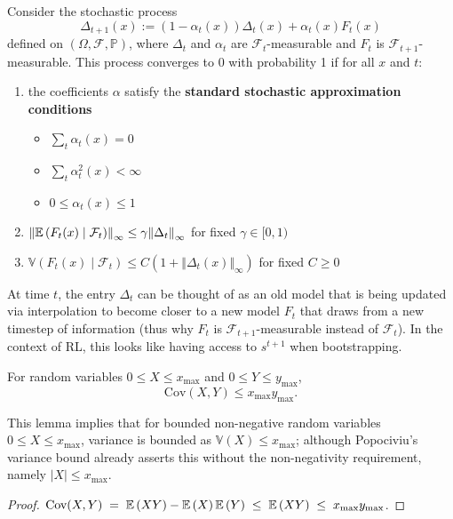 \documentclass[twoside,10pt]{report}
\begin{document}
\begin{thrm}[Jaakkola et al.]
Consider the stochastic process
\[
\Delta_{t+1}(x) := (1-\alpha_{t}(x)) \Delta_{t}(x) + \alpha_{t}(x) F_{t}(x)
\] defined on $(\Omega,\mathcal{F},\mathbb{P})$, where $\Delta_{t}$ and $\alpha_{t}$ are $\mathcal{F}_{t}$-measurable and $F_{t}$ is $\mathcal{F}_{t+1}$-measurable. This process converges to 0 with probability 1 if for all $x$ and $t$:
\begin{enumerate}
	\item the coefficients $\alpha$ satisfy the \textbf{standard stochastic approximation conditions}
		\begin{itemize}
			\item $\sum_{t}\alpha_{t}(x) = 0$ 
			\item $\sum_{t}\alpha_{t}^2(x) < \infty$ 
			\item $0 \leq \alpha_{t}(x) \leq 1$
		\end{itemize}
	\item ${\Vert{\mathbb{E} \left(  F_{t}(x) \;|\; \mathcal{F}_{t}  \right)}\Vert}_{\infty} \leq \gamma {\Vert{\Delta_{t}}\Vert}_{\infty}$ for fixed $\gamma \in [0, 1)$
	\item $\mathbb{V}\left( F_{t}(x) \;|\; \mathcal{F}_{t} \right) \leq C \left( 1 + {\Vert{\Delta_{t}(x)}\Vert}_{\infty} \right)$ for fixed $C \geq 0$
\end{enumerate}
\end{thrm}

At time $t$, the entry $\Delta_{t}$ can be thought of as an old model that is being updated via interpolation to become closer to a new model $F_{t}$ that draws from a new timestep of information (thus why $F_{t}$ is $\mathcal{F}_{t+1}$-measurable instead of $\mathcal{F}_{t}$). In the context of RL, this looks like having access to $s^{t+1}$ when bootstrapping.

\begin{lem}
For random variables $0 \leq X \leq x_{\text{max}}$ and $0 \leq Y \leq y_{\text{max}}$,
\[
\text{Cov}(X,Y) \leq x_{\text{max}} y_{\text{max}}.
\]
\end{lem}
This lemma implies that for bounded non-negative random variables $0 \leq X \leq x_{\text{max}}$, variance is bounded as $\mathbb{V}(X) \leq x_{\text{max}}$; although Popociviu's variance bound already asserts this without the non-negativity requirement, namely $|X| \leq x_{\text{max}}$.
\begin{proof}
	$\text{Cov}(X,Y) \;=\; \mathbb{E} \left(  XY  \right) - \mathbb{E} \left(  X  \right)\mathbb{E} \left(  Y  \right) \;\leq\; \mathbb{E} \left(  XY  \right) \;\leq\; x_{\text{max}}y_{\text{max}}$.
\end{proof}
\end{document}
